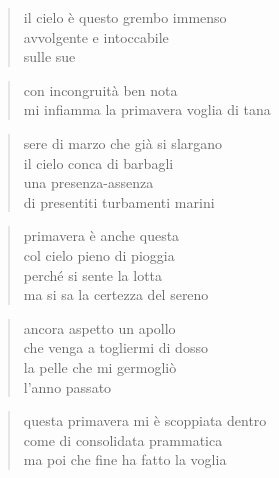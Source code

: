 \clearpage


\begin{verse}
    il cielo è questo grembo immenso\\
    avvolgente e intoccabile\\
    sulle sue
\end{verse}

\begin{verse}
    con incongruità ben nota\\
    mi infiamma la primavera voglia di tana
\end{verse}

\clearpage


\begin{verse}
    sere di marzo che già si slargano\\
    il cielo conca di barbagli\\
    una presenza-assenza\\
    di presentiti turbamenti marini
\end{verse}

\clearpage


\begin{verse}
     primavera è anche questa\\
     col cielo pieno di pioggia\\
     perché si sente la lotta\\
     ma si sa la certezza del sereno
\end{verse}

\clearpage


\begin{verse}
    ancora aspetto un apollo\\
    che venga a togliermi di dosso\\
    la pelle che mi germogliò\\
    l'anno passato
\end{verse}

\clearpage


\begin{verse}
    questa primavera mi è scoppiata dentro\\
    come di consolidata prammatica\\
    ma poi che fine ha fatto la voglia
\end{verse}

